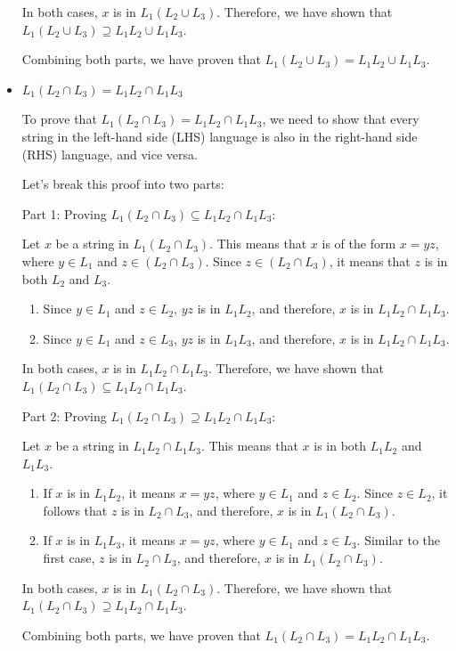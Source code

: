 \documentclass{article}
\begin{document}
\begin{itemize}
  In both cases, $x$ is in $L_1(L_2 \cup L_3)$. Therefore, we have shown that $L_1(L_2 \cup L_3) \supseteq L_1L_2 \cup L_1L_3$.
  
  Combining both parts, we have proven that $L_1(L_2 \cup L_3) = L_1L_2 \cup L_1L_3$.

  \item $L_1(L_2 \cap L_3) = L_1L_2 \cap L_1L_3$
  
  To prove that $L_1(L_2 \cap L_3) = L_1L_2 \cap L_1L_3$, we need to show that every string in the left-hand side (LHS) language is also in the right-hand side (RHS) language, and vice versa.

  Let's break this proof into two parts:

  Part 1: Proving $L_1(L_2 \cap L_3) \subseteq L_1L_2 \cap L_1L_3$:

  Let $x$ be a string in $L_1(L_2 \cap L_3)$. This means that $x$ is of the form $x = yz$, where $y \in L_1$ and $z \in (L_2 \cap L_3)$. Since $z \in (L_2 \cap L_3)$, it means that $z$ is in both $L_2$ and $L_3$.

  \begin{enumerate}
    \item Since $y \in L_1$ and $z \in L_2$, $yz$ is in $L_1L_2$, and therefore, $x$ is in $L_1L_2 \cap L_1L_3$.
    \item Since $y \in L_1$ and $z \in L_3$, $yz$ is in $L_1L_3$, and therefore, $x$ is in $L_1L_2 \cap L_1L_3$.
  \end{enumerate}
  

  In both cases, $x$ is in $L_1L_2 \cap L_1L_3$. Therefore, we have shown that $L_1(L_2 \cap L_3) \subseteq L_1L_2 \cap L_1L_3$.

  Part 2: Proving $L_1(L_2 \cap L_3) \supseteq L_1L_2 \cap L_1L_3$:

  Let $x$ be a string in $L_1L_2 \cap L_1L_3$. This means that $x$ is in both $L_1L_2$ and $L_1L_3$.

  \begin{enumerate}
    \item If $x$ is in $L_1L_2$, it means $x = yz$, where $y \in L_1$ and $z \in L_2$. Since $z \in L_2$, it follows that $z$ is in $L_2 \cap L_3$, and therefore, $x$ is in $L_1(L_2 \cap L_3)$.
    \item If $x$ is in $L_1L_3$, it means $x = yz$, where $y \in L_1$ and $z \in L_3$. Similar to the first case, $z$ is in $L_2 \cap L_3$, and therefore, $x$ is in $L_1(L_2 \cap L_3)$.
  \end{enumerate}
  
  In both cases, $x$ is in $L_1(L_2 \cap L_3)$. Therefore, we have shown that $L_1(L_2 \cap L_3) \supseteq L_1L_2 \cap L_1L_3$.

  Combining both parts, we have proven that $L_1(L_2 \cap L_3) = L_1L_2 \cap L_1L_3$.

\end{itemize}
\end{document}
